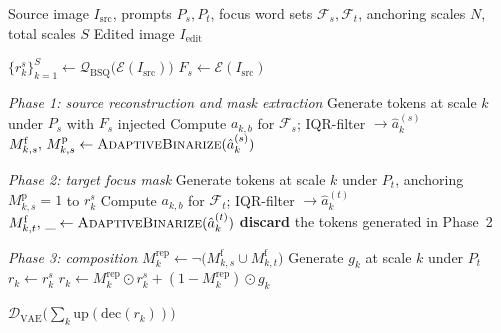 \begin{algorithm}[t]
\caption{Three-Phase Attention-Masked Editing}
\label{alg:editing}
\small
\begin{algorithmic}[1]
\Require Source image $I_{\mathrm{src}}$, prompts $P_s, P_t$, focus word sets $\mathcal{F}_s, \mathcal{F}_t$,
         anchoring scales $N$, total scales $S$
\Ensure Edited image $I_{\mathrm{edit}}$

\State $\{r_k^s\}_{k=1}^{S} \gets \mathcal{Q}_{\mathrm{BSQ}}\!\bigl(\mathcal{E}(I_{\mathrm{src}})\bigr)$
\State $F_s \gets \mathcal{E}(I_{\mathrm{src}})$ 


    \Statex \textit{\quad Phase 1: source reconstruction and mask extraction}
    \State Generate tokens at scale $k$ under $P_s$ with $F_s$ injected
        \State Compute $a_{k,b}$ for $\mathcal{F}_s$; IQR-filter $\to \hat{a}_k^{(s)}$
        \State $M_{k,s}^{\mathrm{f}},\, M_{k,s}^{\mathrm{p}} \gets
               \textsc{AdaptiveBinarize}(\hat{a}_k^{(s)})$ 
    \EndIf

    \Statex \textit{\quad Phase 2: target focus mask}
    \State Generate tokens at scale $k$ under $P_t$, anchoring
           $M_{k,s}^{\mathrm{p}}{=}1$ to $r_k^s$
        \State Compute $a_{k,b}$ for $\mathcal{F}_t$; IQR-filter $\to \hat{a}_k^{(t)}$
        \State $M_{k,t}^{\mathrm{f}},\, \_ \gets
               \textsc{AdaptiveBinarize}(\hat{a}_k^{(t)})$
    \EndIf
    \State \textbf{discard} the tokens generated in Phase~2

    \Statex \textit{\quad Phase 3: composition}
    \State $M_k^{\mathrm{rep}} \gets \neg\!\bigl(M_{k,s}^{\mathrm{f}} \cup M_{k,t}^{\mathrm{f}}\bigr)$
    \State Generate $g_k$ at scale $k$ under $P_t$
        \State $r_k \gets r_k^s$ 
    \Else
        \State $r_k \gets M_k^{\mathrm{rep}} \odot r_k^s + (1{-}M_k^{\mathrm{rep}}) \odot g_k$
    \EndIf

\EndFor

\State \Return $\mathcal{D}_{\mathrm{VAE}}\!\bigl(\textstyle\sum_{k} \mathrm{up}(\mathrm{dec}(r_k))\bigr)$
\end{algorithmic}
\end{algorithm}
